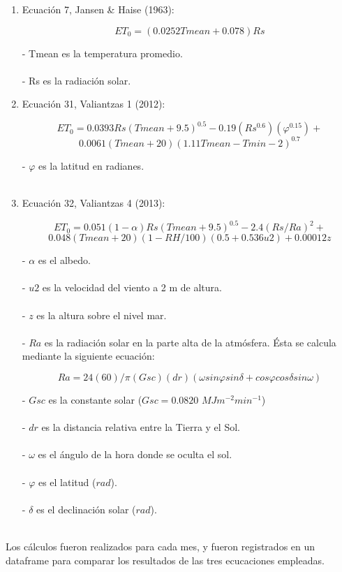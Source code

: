 \documentclass[letterpaper,12pt]{article}
\begin{document}
\begin{enumerate}
    \item Ecuación 7, Jansen & Haise (1963):
    
    \[ET_{0} = (0.0252Tmean + 0.078)Rs\]
     
     - Tmean es la temperatura promedio.\\\\
     - Rs es la radiación solar.

    \item Ecuación 31, Valiantzas 1 (2012):

    \[ET_{0} = 0.0393 Rs (Tmean + 9.5)^{0.5} - 0.19(Rs^{0.6})(\varphi^{0.15}) +\] \[0.0061(Tmean + 20)(1.11Tmean - Tmin - 2)^{0.7}\]
     
     - $\varphi$ es la latitud en radianes.\\\\

    \item Ecuación 32, Valiantzas 4 (2013):

    \[ET_{0} = 0.051(1 - \alpha)Rs(Tmean + 9.5)^{0.5} - 2.4(Rs/Ra)^2 +\] 
    \[0.048(Tmean + 20)(1 - RH/100)(0.5 + 0.536u2) + 0.00012z\]

    - $\alpha$ es el albedo.\\\\
    - $u2$ es la velocidad del viento a 2 m de altura.\\\\
    - $z$ es la altura sobre el nivel mar.\\\\
    - $Ra$ es la radiación solar en la parte alta de la atmósfera. Ésta se calcula mediante la siguiente ecuación:
    
        \[Ra = 24(60)/\pi (Gsc)(dr)(\omega sin\varphi sin\delta + cos\varphi cos\delta sin\omega)\]

    - $Gsc$ es la constante solar ($Gsc=0.0820$ $MJm^{-2}min^{-1}$)\\\\
    - $dr$ es la distancia relativa entre la Tierra y el Sol.\\\\
    - $\omega$ es el ángulo de la hora donde se oculta el sol.\\\\
    - $\varphi$ es el latitud ($rad$).\\\\
    - $\delta$ es el declinación solar ($rad$).\\\\
\end{enumerate}
Los cálculos fueron realizados para cada mes, y fueron registrados en un dataframe para comparar los resultados de las tres ecucaciones empleadas.
\end{document}
